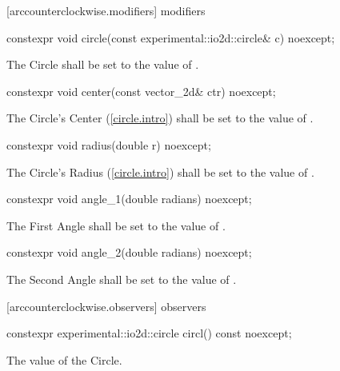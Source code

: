  [arccounterclockwise.modifiers]{ modifiers}

\begin{itemdecl}
constexpr void circle(const experimental::io2d::circle& c) noexcept;
\end{itemdecl}
\begin{itemdescr}
\pnum
\effects
The Circle shall be set to the value of .
\end{itemdescr}

\begin{itemdecl}
constexpr void center(const vector_2d& ctr) noexcept;
\end{itemdecl}
\begin{itemdescr}
\pnum
\effects
The Circle's Center (\ref{circle.intro}) shall be set to the value of .
\end{itemdescr}

\begin{itemdecl}
constexpr void radius(double r) noexcept;
\end{itemdecl}
\begin{itemdescr}
\pnum
\effects
The Circle's Radius (\ref{circle.intro}) shall be set to the value of .
\end{itemdescr}

\begin{itemdecl}
constexpr void angle_1(double radians) noexcept;
\end{itemdecl}
\begin{itemdescr}
\pnum
\effects
The First Angle shall be set to the value of .
\end{itemdescr}

\begin{itemdecl}
constexpr void angle_2(double radians) noexcept;
\end{itemdecl}
\begin{itemdescr}
\pnum
\effects
The Second Angle shall be set to the value of .
\end{itemdescr}

 [arccounterclockwise.observers]{ observers}

\begin{itemdecl}
constexpr experimental::io2d::circle circl() const noexcept;
\end{itemdecl}
\begin{itemdescr}
\pnum
\returns
The value of the Circle.
\end{itemdescr}

